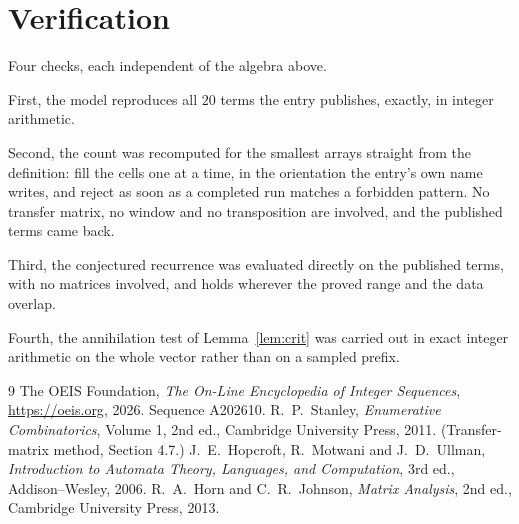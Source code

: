 \documentclass[11pt,a4paper]{article}
\theoremstyle{plain}
\theoremstyle{definition}
\begin{document}
\section{Verification}

Four checks, each independent of the algebra above.

First, the model reproduces all $20$ terms the entry publishes, exactly, in integer
arithmetic.

Second, the count was recomputed for the smallest arrays straight from the definition: fill the
cells one at a time, in the orientation the entry's own name writes, and reject as soon as a
completed run matches a forbidden pattern. No transfer matrix, no window and no transposition
are involved, and the published terms came back.

Third, the conjectured recurrence was evaluated directly on the published terms, with no
matrices involved, and holds wherever the proved range and the data overlap.

Fourth, the annihilation test of Lemma~\ref{lem:crit} was carried out in exact integer
arithmetic on the whole vector rather than on a sampled prefix.

\begin{thebibliography}{9}
 The OEIS Foundation, \emph{The On-Line Encyclopedia of Integer
Sequences}, \url{https://oeis.org}, 2026. Sequence A202610.
 R.~P.~Stanley, \emph{Enumerative Combinatorics}, Volume 1, 2nd ed.,
Cambridge University Press, 2011. (Transfer-matrix method, Section 4.7.)
 J.~E.~Hopcroft, R.~Motwani and J.~D.~Ullman, \emph{Introduction to Automata
Theory, Languages, and Computation}, 3rd ed., Addison--Wesley, 2006.
 R.~A.~Horn and C.~R.~Johnson, \emph{Matrix Analysis}, 2nd ed., Cambridge
University Press, 2013.
\end{thebibliography}
\end{document}
